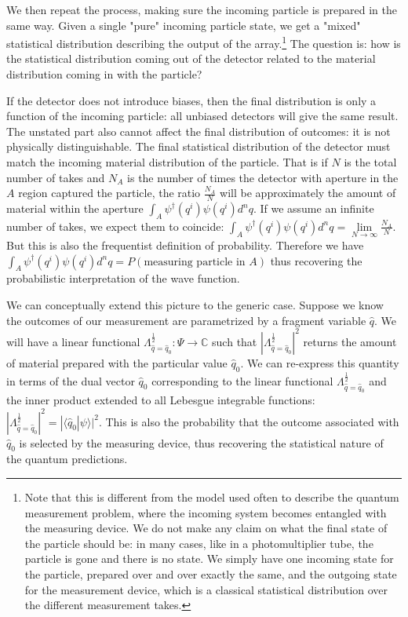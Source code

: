 \documentclass[smallextended]{svjour3}
\numberwithin{equation}{section}
\theoremstyle{definition}
\begin{document}
We then repeat the process, making sure the incoming particle is prepared in the same way. Given a single "pure" incoming particle state, we get a "mixed" statistical distribution describing the output of the array.\footnote{Note that this is different from the model used often to describe the quantum measurement problem, where the incoming system becomes entangled with the measuring device. We do not make any claim on what the final state of the particle should be: in many cases, like in a photomultiplier tube, the particle is gone and there is no state. We simply have one incoming state for the particle, prepared over and over exactly the same, and the outgoing state for the measurement device, which is a classical statistical distribution over the different measurement takes.} The question is: how is the statistical distribution coming out of the detector related to the material distribution coming in with the particle?

If the detector does not introduce biases, then the final distribution is only a function of the incoming particle: all unbiased detectors will give the same result. The unstated part also cannot affect the final distribution of outcomes: it is not physically distinguishable. The final statistical distribution of the detector must match the incoming material distribution of the particle. That is if $N$ is the total number of takes and $N_A$ is the number of times the detector with aperture in the $A$ region captured the particle, the ratio $\frac{N_A}{N}$ will be approximately the amount of material within the aperture $\int_A \psi^\dagger(q^i) \psi(q^i) d^nq$. If we assume an infinite number of takes, we expect them to coincide: $\int_A \psi^\dagger(q^i) \psi(q^i) d^nq = \lim\limits_{N\rightarrow\infty} \frac{N_A}{N}$. But this is also the frequentist definition of probability. Therefore we have $\int_A \psi^\dagger(q^i) \psi(q^i) d^nq = P(\textrm{measuring particle in } A)$ thus recovering the probabilistic interpretation of the wave function.

We can conceptually extend this picture to the generic case. Suppose we know the outcomes of our measurement are parametrized by a fragment variable $\hat{q}$. We will have a linear functional $\Lambda^{\frac{1}{2}}_{\hat{q}=\hat{q}_0} : \Psi \rightarrow \mathbb{C}$ such that $|\Lambda^{\frac{1}{2}}_{\hat{q}=\hat{q}_0}|^2$ returns the amount of material prepared with the particular value $\hat{q}_0$. We can re-express this quantity in terms of the dual vector $\hat{q}_0$ corresponding to the linear functional $\Lambda^{\frac{1}{2}}_{\hat{q}=\hat{q}_0}$ and the inner product extended to all Lebesgue integrable functions: $|\Lambda^{\frac{1}{2}}_{\hat{q}=\hat{q}_0}|^2 = |\langle \hat{q}_0 | \psi \rangle|^2 $. This is also the probability that the outcome associated with $\hat{q}_0$ is selected by the measuring device, thus recovering the statistical nature of the quantum predictions. 
\end{document}
